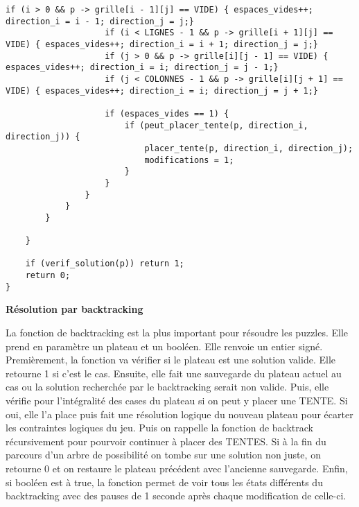 \documentclass{article}
\begin{document}
\begin{lstlisting}[style=Cstyle]
                    if (i > 0 && p -> grille[i - 1][j] == VIDE) { espaces_vides++; direction_i = i - 1; direction_j = j;}
                    if (i < LIGNES - 1 && p -> grille[i + 1][j] == VIDE) { espaces_vides++; direction_i = i + 1; direction_j = j;}
                    if (j > 0 && p -> grille[i][j - 1] == VIDE) { espaces_vides++; direction_i = i; direction_j = j - 1;}
                    if (j < COLONNES - 1 && p -> grille[i][j + 1] == VIDE) { espaces_vides++; direction_i = i; direction_j = j + 1;}
                    
                    if (espaces_vides == 1) {
                        if (peut_placer_tente(p, direction_i, direction_j)) {
                            placer_tente(p, direction_i, direction_j);
                            modifications = 1;
                        }
                    }
                }
            }
        }
        
    }

    if (verif_solution(p)) return 1;
    return 0;
}
\end{lstlisting}

\textbf{Résolution par backtracking}

    La fonction de backtracking est la plus important pour résoudre les puzzles. Elle prend en paramètre un plateau et un booléen. Elle renvoie un entier signé. Premièrement, la fonction va vérifier si le plateau est une solution valide. Elle retourne 1 si c'est le cas. Ensuite, elle fait une sauvegarde du plateau actuel au cas ou la solution recherchée par le backtracking serait non valide. Puis, elle vérifie pour l'intégralité des cases du plateau si on peut y placer une TENTE. Si oui, elle l'a place puis fait une résolution logique  du nouveau plateau pour écarter les contraintes logiques du jeu. Puis on rappelle la fonction de backtrack récursivement pour pourvoir continuer à placer des TENTES. Si à la fin du parcours d'un arbre de possibilité on tombe sur une solution non juste, on retourne 0 et on restaure le plateau précédent avec l'ancienne sauvegarde. Enfin, si booléen est à true, la fonction permet de voir tous les états différents du backtracking avec des pauses de 1 seconde après chaque modification de celle-ci.
\end{document}
